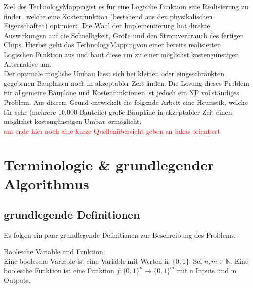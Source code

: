 \documentclass[11pt, a4paper, german]{article}
\newcommand{\TM}{TechnologyMapping}
\begin{document}
Ziel des \TM ist es für eine Logische Funktion eine Realisierung zu finden, welche eine Kostenfunktion (bestehend aus den physikalischen Eigenschaften) optimiert. Die Wahl der Implementierung hat direkte Auswirkungen auf die  Schnelligkeit, Größe und den Stromverbrauch des fertigen Chips. Hierbei geht das \TM von einer bereits realisierten Logischen Funktion aus und baut diese um zu einer möglichst kostengünstigen Alternative um. \\
Der optimale mögliche Umbau lässt sich bei kleinen oder eingeschränkten gegebenen Bauplänen noch in akzeptabler Zeit finden. Die Lösung dieses Problem für allgemeine Baupläne und Kostenfunktionen ist jedoch ein NP vollständiges Problem. Aus diesem Grund entwickelt die folgende Arbeit eine Heuristik, welche für sehr (mehrere 10.000 Bauteile) große Baupläne in akzeptabler Zeit einen möglichst kostengünstigen Umbau ermöglicht.\\
\textcolor{red}{am ende hier noch eine kurze Quellenübersicht geben an lukas orientiert}

\newpage

\section{Terminologie \& grundlegender Algorithmus}
\label{sec:terminologie&grundl}
\subsection{grundlegende Definitionen}
\label{subsec:grundlegende_definitionen}
Es folgen ein paar grundlegende Definitionen zur Beschreibung des Problems.

\begin{definition}{Boolesche Variable und Funktion: } \\
Eine boolesche Variable ist eine Variable mit Werten in $ \{ 0 , 1 \} $.
Sei $ n, m \in \mathbb{N}$. Eine boolesche Funktion ist eine Funktion $ f : \{ 0 , 1 \}^n \rightarrow \{ 0 , 1 \}^m $ mit n Inputs und m Outputs. 
\end{definition}
\end{document}
